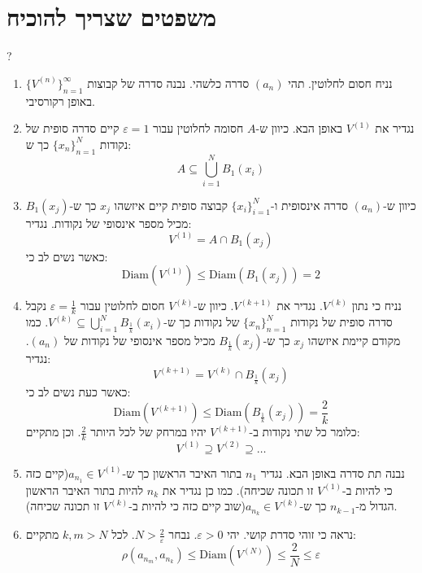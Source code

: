 \documentclass{tstextbook}
\begin{document}
\section{משפטים שצריך להוכיח}

?

\begin{enumerate}
  \item נניח חסום לחלוטין. תהי \((a_{n})\) סדרה כלשהי. נבנה סדרה של קבוצות \(\{ V^{(n)} \}_{n=1}^{\infty}\) באופן רקורסיבי. 


  \item נגדיר את \(V^{(1)}\) באופן הבא. כיוון ש-\(A\) חסומה לחלוטין עבור \(\varepsilon=1\) קיים סדרה סופית של נקודות \(\{ x_{n} \}_{n=1}^{N}\) כך ש: 
$$A\subseteq \bigcup_{i=1}^{N}B_{1}(x_{i})$$


  \item כיוון ש-\((a_{n})\) סדרה אינסופית ו-\(\{ x_{i} \}_{i=1}^{N}\) קבוצה סופית קיים איזשהו \(x_{j}\) כך ש-\(B_{1}(x_{j})\) מכיל מספר אינסופי של נקודות. נגדיר: 
$$V^{(1)}=A\cap  B_{1}(x_{j})$$
כאשר נשים לב כי:
$$\mathrm{Diam}(V^{(1)})\leq \mathrm{Diam}(B_{1}(x_{j}))=2$$


  \item נניח כי נתון \(V^{(k)}\). נגדיר את \(V^{(k+1)}\). כיוון ש-\(V^{(k)}\) חסום לחלוטין עבור \(\varepsilon= \frac{1}{k}\) נקבל סדרה סופית של נקודות \(\{ x_{n} \}_{n=1}^{N}\) של נקודות כך ש-\(V^{(k)}\subseteq \bigcup_{i=1}^{N}B_{\frac{1}{k}}(x_{i})\). כמו מקודם קיימת איזשהו \(x_{j}\) כך ש-\(B_{\frac{1}{k}}(x_{j})\) מכיל מספר אינסופי של נקודות של \((a_{n})\). נגדיר: 
$$V^{(k+1)}=V^{(k)}\cap  B_{\frac{1}{k}}(x_{j})$$
כאשר כעת נשים לב כי:
$$\mathrm{Diam}(V^{(k+1)})\leq \mathrm{Diam}\left( B_{\frac{1}{k}}(x_{j}) \right)=\frac{2}{k}$$
כלומר כל שתי נקודות ב-\(V^{(k+1)}\) יהיו במרחק של לכל היותר \(\frac{2}{k}\). וכן מתקיים:
$$V^{(1)}\supseteq V^{(2)}\supseteq \dots$$


  \item נבנה תת סדרה באופן הבא. נגדיר \(n_{1}\) בתור האיבר הראשון כך ש-\(a_{n_{1}} \in V^{(1)}\)(קיים כזה כי להיות ב-\(V^{(1)}\) זו תכונה שכיחה). כמו כן נגדיר את \(n_{k}\) להיות בתור האיבר הראשון הגדול מ-\(n_{k-1}\) כך ש-\(a_{n_{k}}\in V^{(k)}\)(שוב קיים כזה כי להיות ב-\(V^{(k)}\) זו תכונה שכיחה).  


  \item נראה כי זוהי סדרת קושי. יהי \(\varepsilon> 0\). נבחר \(N>\frac{2}{\varepsilon}\). לכל \(k,m> N\) מתקיים: 
$$\rho(a_{n_{m}},a_{n_{k}})\leq  \mathrm{Diam}\left( V^{(N)} \right)\leq \frac{2}{N}\leq \varepsilon$$



\end{enumerate}
\end{document}

